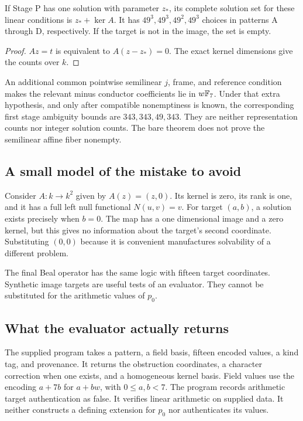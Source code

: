 \begin{corollary}
If Stage P has one solution with parameter $z_*$, its complete solution set for these linear conditions is $z_*+\ker A$. It has $49^3,49^3,49^2,49^3$ choices in patterns A through D, respectively. If the target is not in the image, the set is empty.
\end{corollary}
\begin{proof}
$Az=t$ is equivalent to $A(z-z_*)=0$. The exact kernel dimensions give the counts over $k$.
\end{proof}
An additional common pointwise semilinear $j$, frame, and reference condition makes the relevant minus conductor coefficients lie in $w\mathbb F_7$. Under that extra hypothesis, and only after compatible nonemptiness is known, the corresponding first stage ambiguity bounds are $343,343,49,343$. They are neither representation counts nor integer solution counts. The bare theorem does not prove the semilinear affine fiber nonempty.

\subsection{A small model of the mistake to avoid}
Consider $A:k\to k^2$ given by $A(z)=(z,0)$. Its kernel is zero, its rank is one, and it has a full left null functional $N(u,v)=v$. For target $(a,b)$, a solution exists precisely when $b=0$. The map has a one dimensional image and a zero kernel, but this gives no information about the target's second coordinate. Substituting $(0,0)$ because it is convenient manufactures solvability of a different problem.

The final Beal operator has the same logic with fifteen target coordinates. Synthetic image targets are useful tests of an evaluator. They cannot be substituted for the arithmetic values of $p_0$.

\subsection{What the evaluator actually returns}
The supplied program takes a pattern, a field basis, fifteen encoded values, a kind tag, and provenance. It returns the obstruction coordinates, a character correction when one exists, and a homogeneous kernel basis. Field values use the encoding $a+7b$ for $a+bw$, with $0\le a,b<7$. The program records arithmetic target authentication as false. It verifies linear arithmetic on supplied data. It neither constructs a defining extension for $p_0$ nor authenticates its values.

